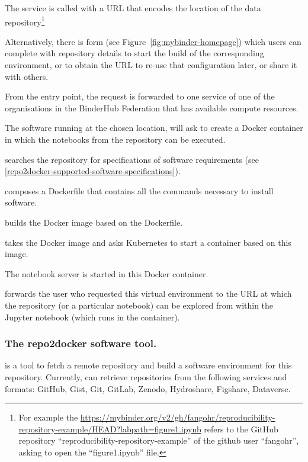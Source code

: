\begin{compactitem}
\item The \mybinder{} service is called with a URL that encodes the location of the data
  repository\footnote{For example the
    {\url{https://mybinder.org/v2/gh/fangohr/reproducibility-repository-example/HEAD?labpath=figure1.ipynb}}
    refers to the GitHub repository ``reproducibility-repository-example'' of the
    github user ``fangohr'', asking to open the ``figure1.ipynb'' file.}

  Alternatively, there is form (see Figure~\ref{fig:mybinder-homepage})
  which users can complete with repository details
  to start the build of the corresponding environment, or to obtain the URL to
  re-use that configuration later, or share it with others.
\item From the \mybinder{} entry point, the request is forwarded to one
  \binderhub{} service of one of the organisations in the BinderHub Federation
  that has available compute resources.
\item The \binderhub{} software running at the chosen location, will ask
  \repotodocker{} to create a Docker container in which the notebooks from the repository can be executed.
\item \repotodocker{} searches the repository for specifications of software requirements (see \ref{repo2docker-supported-software-specifications}).
\item \repotodocker{} composes a Dockerfile that contains all the commands
  necessary to install software.
\item \repotodocker{} builds the Docker image based on the Dockerfile.
\item \binderhub{} takes the Docker image and asks Kubernetes to start
  a container based on this image.
\item The notebook server is started in this Docker container.
\item \binderhub{} forwards the user who requested this virtual environment to
  the URL at which the repository (or a particular notebook) can be explored
  from within the Jupyter notebook (which runs in the container).
\end{compactitem}

\subsubsection{The repo2docker software tool.}\label{sec:repo2docker}

\repotodocker{} is a tool to fetch a remote repository and build a software
environment for this repository. Currently, \repotodocker{} can retrieve
repositories from the following services and formats: GitHub, Gist, Git, GitLab,
Zenodo, Hydroshare, Figshare, Dataverse.

